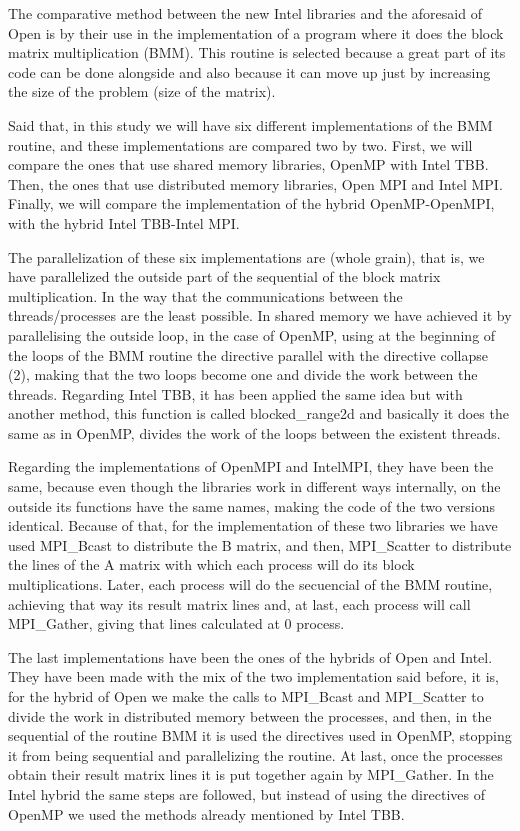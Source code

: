 \documentclass[a4paper,12pt]{article}
\begin{document}
The comparative method between the new Intel libraries and the aforesaid of Open is by their use in the implementation of a program where it does the block matrix multiplication (BMM). This routine is selected because a great part of its code can be done alongside and also because it can move up just by increasing the size of the problem (size of the matrix).

Said that, in this study we will have six different implementations of the BMM routine, and these implementations are compared two by two. First, we will compare the ones that use shared memory libraries, OpenMP with Intel TBB. Then, the ones that use distributed memory libraries, Open MPI and Intel MPI. Finally, we will compare the implementation of the hybrid OpenMP-OpenMPI, with the hybrid Intel TBB-Intel MPI.

The parallelization of these six implementations are (whole grain), that is, we have parallelized the outside part of the sequential of the block matrix multiplication. In the way that the communications between the threads/processes are the least possible. In shared memory we have achieved it by parallelising the outside loop, in the case of OpenMP, using at the beginning of the loops of the BMM routine the directive parallel with the directive collapse (2), making that the two loops become one and divide the work between the threads. Regarding Intel TBB, it has been applied the same idea but with another method, this function is called blocked\_range2d and basically it does the same as in OpenMP, divides the work of the loops between the existent threads.

Regarding the implementations of OpenMPI and IntelMPI, they have been the same, because even though the libraries work in different ways internally, on the outside its functions have the same names, making the code of the two versions identical. Because of that, for the implementation of these two libraries we have used MPI\_Bcast to distribute the B matrix, and then, MPI\_Scatter to distribute the lines of the A matrix with which each process will do its block multiplications. Later, each process will do the secuencial of the BMM routine, achieving that way its result matrix lines and, at last, each process will call MPI\_Gather, giving that lines calculated at 0 process.

The last implementations have been the ones of the hybrids of Open and Intel. They have been made with the mix of the two implementation said before, it is, for the hybrid of Open we make the calls to MPI\_Bcast and MPI\_Scatter to divide the work in distributed memory between the processes, and then, in the sequential of the routine BMM it is used the directives used in OpenMP, stopping it from being sequential and parallelizing the routine. At last, once the processes obtain their result matrix lines it is put together again by MPI\_Gather. In the Intel hybrid the same steps are followed, but instead of using the directives of OpenMP we used the methods already mentioned by Intel TBB.
\end{document}
